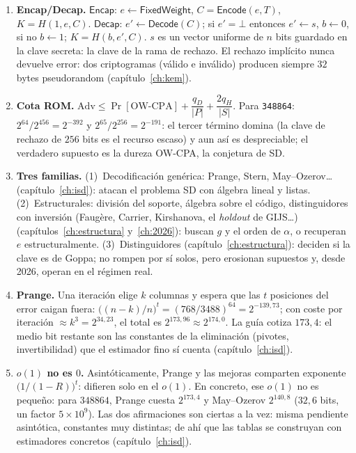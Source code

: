 \begin{enumerate}[leftmargin=1.9em,itemsep=5pt]
  \item \textbf{Encap/Decap.}
        $\textsf{Encap}$: $e\leftarrow\textsf{FixedWeight}$,
        $C=\textsf{Encode}(e,T)$, $K=H(1,e,C)$.
        $\textsf{Decap}$: $e'\leftarrow\textsf{Decode}(C)$; si
        $e'=\bot$ entonces $e'\leftarrow s$, $b\leftarrow0$, si no
        $b\leftarrow1$; $K=H(b,e',C)$. $s$ es un vector uniforme
        de $n$ bits guardado en la clave secreta: la clave de la
        rama de rechazo. El rechazo implícito nunca devuelve
        error: dos criptogramas (válido e inválido) producen
        siempre $32$ bytes pseudorandom (capítulo~\ref{ch:kem}).

  \item \textbf{Cota ROM.}
        $\mathrm{Adv}\le\Pr[\text{OW-CPA}]+\dfrac{q_D}{|P|}
        +\dfrac{2q_H}{|S|}$. Para \texttt{348864}:
        $2^{64}/2^{456}=2^{-392}$ y
        $2^{65}/2^{256}=2^{-191}$: el tercer término domina (la
        clave de rechazo de $256$ bits es el recurso escaso) y
        aun así es despreciable; el verdadero supuesto es la
        dureza OW-CPA, la conjetura de SD.

  \item \textbf{Tres familias.} (1)~Decodificación genérica: Prange,
        Stern, May--Ozerov\dots (capítulo~\ref{ch:isd}): atacan el
        problema SD con álgebra lineal y listas. (2)~Estructurales:
        división del soporte, álgebra sobre el código, distinguidores
        con inversión (Faug\`ere, Carrier, Kirshanova, el
        \emph{holdout} de GIJS\dots) (capítulos~\ref{ch:estructura}
        y~\ref{ch:2026}): buscan $g$ y el orden de $\alpha$, o
        recuperan $e$ estructuralmente. (3)~Distinguidores
        (capítulo~\ref{ch:estructura}): deciden si la clave es de
        Goppa; no rompen por sí solos, pero erosionan supuestos y,
        desde 2026, operan en el régimen real.

  \item \textbf{Prange.} Una iteración elige $k$ columnas y espera
        que las $t$ posiciones del error caigan fuera:
        $\bigl((n-k)/n\bigr)^{t}=(768/3488)^{64}=2^{-139{,}73}$;
        con coste por iteración $\approx k^3=2^{34{,}23}$, el
        total es $2^{173{,}96}\approx2^{174{,}0}$. La guía cotiza
        $173{,}4$: el medio bit restante son las constantes de la
        eliminación (pivotes, invertibilidad) que el estimador
        fino sí cuenta (capítulo~\ref{ch:isd}).

  \item \textbf{$o(1)$ no es $0$.} Asintóticamente, Prange y las
        mejoras comparten exponente $\bigl(1/(1-R)\bigr)^{t}$:
        difieren solo en el $o(1)$. En concreto, ese $o(1)$ no
        es pequeño: para $348864$, Prange cuesta $2^{173{,}4}$ y
        May--Ozerov $2^{140{,}8}$ ($32{,}6$ bits, un factor
        $5\times10^{9}$). Las dos afirmaciones son ciertas a la vez:
        misma pendiente asintótica, constantes muy distintas; de
        ahí que las tablas se construyan con estimadores concretos
        (capítulo~\ref{ch:isd}).


\end{enumerate}
